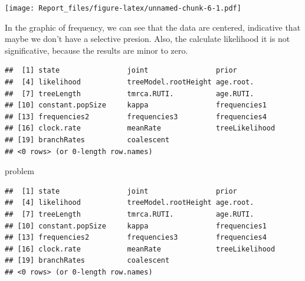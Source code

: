 \documentclass[
]{article}
\newenvironment{Shaded}{\begin{snugshade}}{\end{snugshade}}
\newcommand{\DecValTok}[1]{\textcolor[rgb]{0.00,0.00,0.81}{#1}}
\newcommand{\FunctionTok}[1]{\textcolor[rgb]{0.00,0.00,0.00}{#1}}
\newcommand{\NormalTok}[1]{#1}
\newcommand{\OtherTok}[1]{\textcolor[rgb]{0.56,0.35,0.01}{#1}}
\newcommand{\SpecialCharTok}[1]{\textcolor[rgb]{0.00,0.00,0.00}{#1}}
\begin{document}
\texttt{[image: Report\_files/figure-latex/unnamed-chunk-6-1.pdf]}

In the graphic of frequency, we can see that the data are centered,
indicative that maybe we don't have a selective presion. Also, the
calculate likelihood it is not significative, because the results are
minor to zero.

\begin{Shaded}
\end{Shaded}

\begin{verbatim}
##  [1] state                joint                prior               
##  [4] likelihood           treeModel.rootHeight age.root.           
##  [7] treeLength           tmrca.RUTI.          age.RUTI.           
## [10] constant.popSize     kappa                frequencies1        
## [13] frequencies2         frequencies3         frequencies4        
## [16] clock.rate           meanRate             treeLikelihood      
## [19] branchRates          coalescent          
## <0 rows> (or 0-length row.names)
\end{verbatim}

\begin{Shaded}
\begin{Highlighting}[]
\NormalTok{problem}
\end{Highlighting}
\end{Shaded}

\begin{verbatim}
##  [1] state                joint                prior               
##  [4] likelihood           treeModel.rootHeight age.root.           
##  [7] treeLength           tmrca.RUTI.          age.RUTI.           
## [10] constant.popSize     kappa                frequencies1        
## [13] frequencies2         frequencies3         frequencies4        
## [16] clock.rate           meanRate             treeLikelihood      
## [19] branchRates          coalescent          
## <0 rows> (or 0-length row.names)
\end{verbatim}
\end{document}
